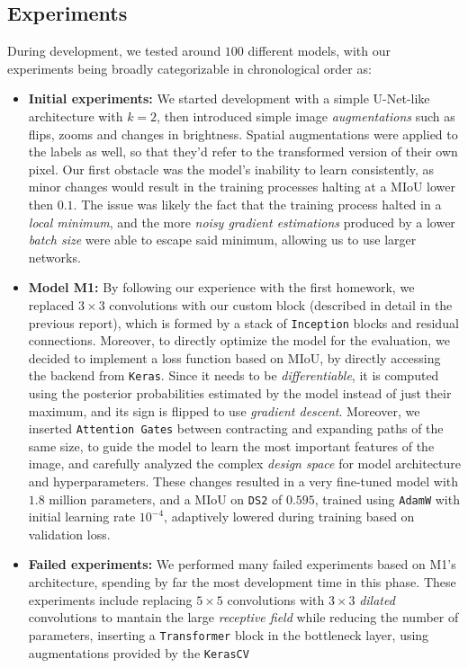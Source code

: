 \documentclass[11pt]{article}
\begin{document}
\begin{multicols}{2}
      \section{Experiments}
      \label{sec:experiments}
      During development, we tested around $100$ different models, with our experiments being broadly categorizable in chronological order as:
      \begin{itemize}[leftmargin=*]
            \setlength\itemsep{0em}
            \item \textbf{Initial experiments:} We started development with a simple U-Net-like architecture with $k=2$, then introduced simple image \textit{augmentations} such as flips, zooms and changes in brightness. Spatial augmentations were applied to the labels as well, so that they'd refer to the transformed version of their own pixel. Our first obstacle was the model's inability to learn consistently, as minor changes would result in the training processes halting at a MIoU lower then $0.1$. The issue was likely the fact that the training process halted in a \textit{local minimum}, and the more \textit{noisy gradient estimations} produced by a lower \textit{batch size} were able to escape said minimum, allowing us to use larger networks.
            \item \textbf{Model M1:} By following our experience with the first homework, we replaced $3\times3$ convolutions with our custom block (described in detail in the previous report), which is formed by a stack of \texttt{Inception} blocks and residual connections. Moreover, to directly optimize the model for the evaluation, we decided to implement a loss function based on MIoU, by directly accessing the backend from \texttt{Keras}. Since it needs to be \textit{differentiable}, it is computed using the posterior probabilities estimated by the model instead of just their maximum, and its sign is flipped to use \textit{gradient descent}. Moreover, we inserted \texttt{Attention Gates}\cite{oktay2018attentionunetlearninglook} between contracting and expanding paths of the same size, to guide the model to learn the most important features of the image, and carefully analyzed the complex \textit{design space} for model architecture and hyperparameters. These changes resulted in a very fine-tuned model with $1.8$ million parameters, and a MIoU on \texttt{DS2} of $0.595$, trained using \texttt{AdamW} with initial learning rate $10^{-4}$, adaptively lowered during training based on validation loss.
            \item \textbf{Failed experiments:} We performed many failed experiments based on M1's architecture, spending by far the most development time in this phase. These experiments include replacing $5\times5$ convolutions with $3\times3$ \textit{dilated} convolutions to mantain the large \textit{receptive field} while reducing the number of parameters, inserting a \texttt{Transformer}\cite{vaswani2023attentionneed} block in the bottleneck layer, using augmentations provided by the \texttt{KerasCV}%

\end{itemize}
\end{multicols}
\end{document}
